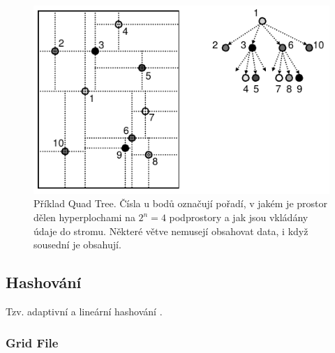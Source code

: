 \begin{figure}[H]
    \centering
    \includegraphics[width=0.75\linewidth]{quad_tree.pdf}
    \caption{Příklad Quad Tree. Čísla u bodů označují pořadí, v jakém je prostor dělen hyperplochami na $2^n = 4$ podprostory a jak jsou vkládány údaje do stromu. Některé větve nemusejí obsahovat data, i když sousední je obsahují.}
\end{figure}

\subsection{Hashování}

\begin{compactitem}
    \item Tzv. adaptivní a lineární hashování .
\end{compactitem}

\subsubsection{Grid File}

